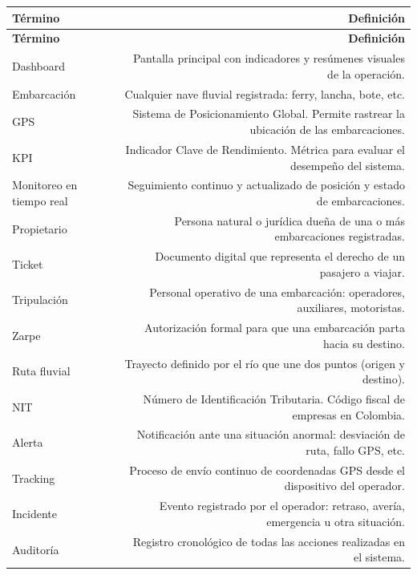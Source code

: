 \documentclass[12pt,a4paper]{article}
\begin{document}
\begin{longtable}{LR}
  \toprule
  \textbf{Término} & \textbf{Definición} \\
  \midrule
  \endfirsthead
  \toprule
  \textbf{Término} & \textbf{Definición} \\
  \midrule
  \endhead
  \bottomrule
  \endfoot
  Dashboard           & Pantalla principal con indicadores y resúmenes visuales de la operación. \\[4pt]
  Embarcación         & Cualquier nave fluvial registrada: ferry, lancha, bote, etc. \\[4pt]
  GPS                 & Sistema de Posicionamiento Global. Permite rastrear la ubicación de las embarcaciones. \\[4pt]
  KPI                 & Indicador Clave de Rendimiento. Métrica para evaluar el desempeño del sistema. \\[4pt]
  Monitoreo en tiempo real & Seguimiento continuo y actualizado de posición y estado de embarcaciones. \\[4pt]
  Propietario         & Persona natural o jurídica dueña de una o más embarcaciones registradas. \\[4pt]
  Ticket              & Documento digital que representa el derecho de un pasajero a viajar. \\[4pt]
  Tripulación         & Personal operativo de una embarcación: operadores, auxiliares, motoristas. \\[4pt]
  Zarpe               & Autorización formal para que una embarcación parta hacia su destino. \\[4pt]
  Ruta fluvial        & Trayecto definido por el río que une dos puntos (origen y destino). \\[4pt]
  NIT                 & Número de Identificación Tributaria. Código fiscal de empresas en Colombia. \\[4pt]
  Alerta              & Notificación ante una situación anormal: desviación de ruta, fallo GPS, etc. \\[4pt]
  Tracking            & Proceso de envío continuo de coordenadas GPS desde el dispositivo del operador. \\[4pt]
  Incidente           & Evento registrado por el operador: retraso, avería, emergencia u otra situación. \\[4pt]
  Auditoría           & Registro cronológico de todas las acciones realizadas en el sistema. \\
\end{longtable}
\end{document}
